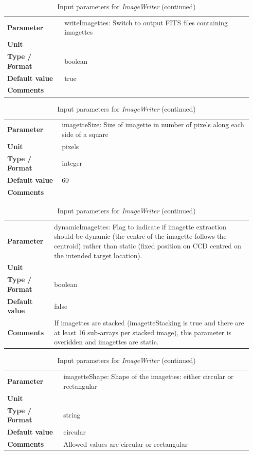 \documentclass[11pt]{article}      %
\def\HCode#1{}
\def\htmlanchor#1{\HCode{<a id="#1"></a>}}
\begin{document}
\begin{table}[hb]
  \caption{Input parameters for {\it ImageWriter} (continued)}

  \htmlanchor{writeImagettes}
  \begin{tabular}{| l | p{13cm} |}
    \hline 
    {\bf Parameter} & writeImagettes: Switch to output FITS files containing imagettes\\
    {\bf Unit} & \\
    {\bf Type / Format} & boolean\\
    {\bf Default value} & true\\
    {\bf Comments} & \\
    \hline
  \end{tabular}
  \bigskip

  \htmlanchor{imagetteSize}
  \begin{tabular}{| l | p{13cm} |}
    \hline 
    {\bf Parameter} & imagetteSize: Size of imagette in number of pixels along each side of a square\\
    {\bf Unit} & pixels\\
    {\bf Type / Format} & integer\\
    {\bf Default value} & 60\\
    {\bf Comments} & \\
    \hline
  \end{tabular}
  \bigskip

  \htmlanchor{dynamicImagettes}
  \begin{tabular}{| l | p{13cm} |}
    \hline 
    {\bf Parameter} & dynamicImagettes: Flag to indicate if imagette extraction should be dynamic (the centre of the imagette follows the centroid) rather than static (fixed position on CCD centred on the intended target location).\\
    {\bf Unit} & \\
    {\bf Type / Format} & boolean\\
    {\bf Default value} & false\\
    {\bf Comments} & If imagettes are stacked (imagetteStacking is true and there are at least 16 sub-arrays per stacked image), this parameter is overidden and imagettes are static.\\
    \hline
  \end{tabular}
  \bigskip

  \htmlanchor{imagetteShape}
  \begin{tabular}{| l | p{13cm} |}
    \hline 
    {\bf Parameter} & imagetteShape: Shape of the imagettes: either circular or rectangular\\
    {\bf Unit} & \\
    {\bf Type / Format} & string\\
    {\bf Default value} & circular\\
    {\bf Comments} & Allowed values are circular or rectangular\\
    \hline
  \end{tabular}
  \bigskip


\end{table}
\end{document}
